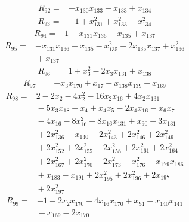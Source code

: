 {%
\begin{align*}
R_{92} ={}& -x_{130} x_{133} - x_{133} + x_{134}
\end{align*}
\begin{align*}
R_{93} ={}& -1 + x_{131}^{2} + x_{133}^{2} - x_{134}^{2}
\end{align*}
\begin{align*}
R_{94} ={}& 1 - x_{131} x_{136} - x_{135} + x_{137}
\end{align*}
\begin{align*}
R_{95} ={}& -x_{131} x_{136} + x_{135} - x_{135}^{2} + 2x_{135} x_{137} + x_{136}^{2} \\
&{}  + x_{137}
\end{align*}
\begin{align*}
R_{96} ={}& 1 + x_{3}^{2} - 2x_{3} x_{131} + x_{138}
\end{align*}
\begin{align*}
R_{97} ={}& -x_{3} x_{170} + x_{17} + x_{138} x_{139} - x_{169}
\end{align*}
\begin{align*}
R_{98} ={}& 2 - 2x_{2} - 4x_{2}^{2} - 16x_{2} x_{16} + 4x_{2} x_{131} \\
&{}  - 5x_{3} x_{18} - x_{4} + x_{4} x_{5} - 2x_{4} x_{16} - x_{6} x_{7} \\
&{}  - 4x_{16} - 8x_{16}^{2} + 8x_{16} x_{131} + x_{90} + 3x_{131} \\
&{}  + 2x_{136}^{2} - x_{140} + 2x_{143}^{2} + 2x_{146}^{2} + 2x_{149}^{2} \\
&{}  + 2x_{152}^{2} + 2x_{155}^{2} + 2x_{158}^{2} + 2x_{161}^{2} + 2x_{164}^{2} \\
&{}  + 2x_{167}^{2} + 2x_{170}^{2} + 2x_{173}^{2} - x_{176}^{2} - x_{179} x_{186} \\
&{}  + x_{183} - x_{191} + 2x_{195}^{2} + 2x_{196}^{2} + 2x_{197} \\
&{}  + 2x_{197}^{2}
\end{align*}
\begin{align*}
R_{99} ={}& -1 - 2x_{2} x_{170} - 4x_{16} x_{170} + x_{94} + x_{140} x_{141} \\
&{}  - x_{169} - 2x_{170}
\end{align*}
\begin{align*}

\end{align*}}
